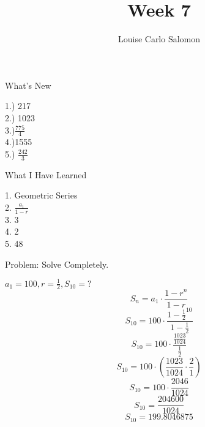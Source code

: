\documentclass{article}
\author{Louise Carlo Salomon}
\title{Week 7}
\date{}
\begin{document}
    \maketitle
    What's New
    \begin{center}
        1.) 217\\2.) 1023\\3.)$\frac{775}{4}$ \\4.)1555\\5.) $\frac{242}{3}$
    \end{center} 
    \par  What I Have Learned 
    \begin{center}
         1. Geometric Series \\ 2. $\frac{a_{1}}{1-r}$ \\ 3. 3 \\ 4. 2 \\ 5. 48
    \end{center}
    Problem: Solve Completely.
    \begin{center}
        $a_{1}=100, r=\frac{1}{2}, S_{10}=?$
        \begin{equation}
            S_n=a_1\cdot\frac{1-r^n}{1-r}
        \end{equation}
        \begin{equation}
            S_{10}=100\cdot\frac{1-\frac{1}{2}^{10}}{1-\frac{1}{2}}
        \end{equation}
        \begin{equation}
            S_{10}=100\cdot\frac{\frac{1023}{1024}}{\frac{1}{2}}
        \end{equation}
        \begin{equation}
            S_{10}=100\cdot\left(\frac{1023}{1024}\cdot\frac{2}{1}\right)
        \end{equation}
        \begin{equation}
            S_{10}=100\cdot\frac{2046}{1024}
        \end{equation}
        \begin{equation}
            S_{10}=\frac{204600}{1024}
        \end{equation}
        \begin{equation}
            S_{10}=199.8046875
        \end{equation}
    \end{center}
\end{document}
